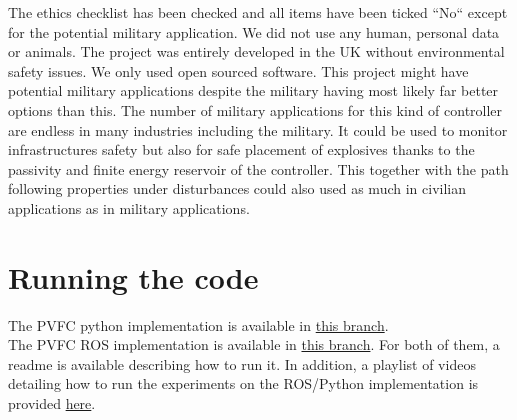 The ethics checklist has been checked and all items have been ticked ``No`` except for the potential military application.
We did not use any human, personal data or animals. The project was entirely developed in the UK without environmental safety issues.
We only used open sourced software.
This project might have potential military applications despite the military having most likely far better options than this. 
The number of military applications for this kind of controller are endless in many industries including the military. 
It could be used to monitor infrastructures safety but also for safe placement of explosives thanks to the passivity and finite energy reservoir of the controller. This together with the path following properties under disturbances could also used as much in civilian applications as in military applications.

\section{Running the code}
The PVFC python implementation is available in \href{https://github.com/bsbretly/pvfc_sim/tree/devel-beta_error}{this branch}.\\
The PVFC ROS implementation is available in \href{https://github.com/bsbretly/pvfc_ws/tree/jonas-pcl}{this branch}.
For both of them, a readme is available describing how to run it. 
In addition, a playlist of videos detailing how to run the experiments on the ROS/Python implementation is provided \href{https://www.youtube.com/watch?v=tSBsaKx5Zww&list=PLvZGCthLI9WrbS7W-F28ljQfRyHxxw-9p}{here}.